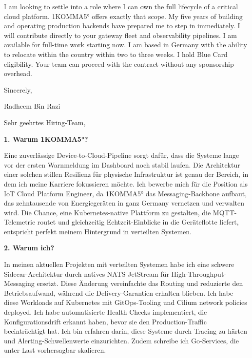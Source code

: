 \documentclass[11pt,a4paper]{coverletter}
\begin{document}
I am looking to settle into a role where I can own the full lifecycle of a critical cloud platform. 1KOMMA5° offers exactly that scope. My five years of building and operating production backends have prepared me to step in immediately. I will contribute directly to your gateway fleet and observability pipelines. I am available for full-time work starting now. I am based in Germany with the ability to relocate within the country within two to three weeks. I hold Blue Card eligibility. Your team can proceed with the contract without any sponsorship overhead.

\closing{Sincerely,}{Radheem Bin Razi}

\clearpage
{}


\opening{Sehr geehrtes Hiring-Team,}

\vspace{8pt}\noindent\textbf{1. Warum 1KOMMA5°?}\par\vspace{3pt}

Eine zuverlässige Device-to-Cloud-Pipeline sorgt dafür, dass die Systeme lange vor der ersten Warnmeldung im Dashboard noch stabil laufen. Die Architektur einer solchen stillen Resilienz für physische Infrastruktur ist genau der Bereich, in dem ich meine Karriere fokussieren möchte. Ich bewerbe mich für die Position als IoT Cloud Platform Engineer, da 1KOMMA5° das Messaging-Backbone aufbaut, das zehntausende von Energiegeräten in ganz Germany vernetzen und verwalten wird. Die Chance, eine Kubernetes-native Plattform zu gestalten, die MQTT-Telemetrie routet und gleichzeitig Echtzeit-Einblicke in die Geräteflotte liefert, entspricht perfekt meinem Hintergrund in verteilten Systemen.

\vspace{8pt}\noindent\textbf{2. Warum ich?}\par\vspace{3pt}

In meinen aktuellen Projekten mit verteilten Systemen habe ich eine schwere Sidecar-Architektur durch natives NATS JetStream für High-Throughput-Messaging ersetzt. Diese Änderung vereinfachte das Routing und reduzierte den Betriebsaufwand, während die Delivery-Garantien erhalten blieben. Ich habe diese Workloads auf Kubernetes mit GitOps-Tooling und Cilium network policies deployed. Ich habe automatisierte Health Checks implementiert, die Konfigurationsdrift erkannt haben, bevor sie den Production-Traffic beeinträchtigt hat. Ich bin erfahren darin, diese Systeme durch Tracing zu härten und Alerting-Schwellenwerte einzurichten. Zudem schreibe ich Go-Services, die unter Last vorhersagbar skalieren.
\end{document}
